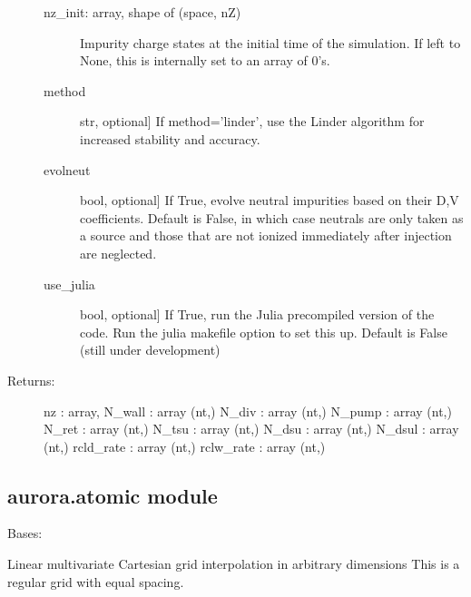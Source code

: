 \documentclass[letterpaper,10pt,english]{sphinxmanual}
\begin{document}
\begin{fulllineitems}
\begin{fulllineitems}
\begin{description}
\begin{description}
\item[{nz\_init: array, shape of (space, nZ)}] \leavevmode
Impurity charge states at the initial time of the simulation. If left to None, this is
internally set to an array of 0’s.

\item[{method}] \leavevmode{[}str, optional{]}
If method=’linder’, use the Linder algorithm for increased stability and accuracy.

\item[{evolneut}] \leavevmode{[}bool, optional{]}
If True, evolve neutral impurities based on their D,V coefficients. Default is False, in
which case neutrals are only taken as a source and those that are not ionized immediately after
injection are neglected.

\item[{use\_julia}] \leavevmode{[}bool, optional{]}
If True, run the Julia pre\sphinxhyphen{}compiled version of the code. Run the julia makefile option to set 
this up. Default is False (still under development)

\end{description}

\item[{Returns:}] \leavevmode
nz : array, 
N\_wall : array (nt,)
N\_div : array (nt,)
N\_pump : array (nt,)
N\_ret : array (nt,)
N\_tsu : array (nt,)
N\_dsu : array (nt,)
N\_dsul : array (nt,)
rcld\_rate : array (nt,)
rclw\_rate : array (nt,)

\end{description}

\end{fulllineitems}


\end{fulllineitems}



\subsection{aurora.atomic module}
\label{\detokenize{aurora:module-aurora.atomic}}\label{\detokenize{aurora:aurora-atomic-module}}

\begin{fulllineitems}
\label{\detokenize{aurora:aurora.atomic.CartesianGrid}}
Bases: 

Linear multivariate Cartesian grid interpolation in arbitrary dimensions
This is a regular grid with equal spacing.

\end{fulllineitems}
\end{document}
